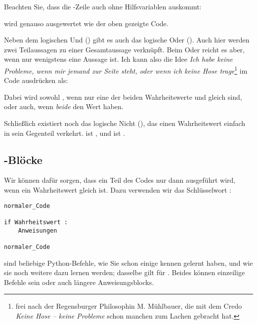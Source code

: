 Beachten Sie, dass die -Zeile auch ohne Hilfsvariablen auskommt:
\begin{center}
\end{center}
wird genauso ausgewertet wie der oben gezeigte Code.

Neben dem logischen Und () gibt es auch das logische Oder (). Auch hier werden zwei Teilaussagen zu einer Gesamtaussage verknüpft. Beim Oder reicht es aber, wenn nur wenigstens eine Aussage  ist. Ich kann also die Idee \emph{Ich habe keine Probleme, wenn mir jemand zur Seite steht, oder wenn ich keine Hose trage}\footnote{frei nach der Regensburger Philosophin M. Mühlbauer, die mit dem Credo \emph{Keine Hose -- keine Probleme} schon manchen zum Lachen gebracht hat.} im Code ausdrücken als:
\begin{center}
\end{center}
Dabei wird  sowohl , wenn nur eine der beiden Wahrheitswerte  und  gleich  sind, oder auch, wenn \emph{beide} den Wert  haben.

Schließlich existiert noch das logische Nicht (), das einen Wahrheitswert einfach in sein Gegenteil verkehrt.  ist , und  ist .

\subsection{-Blöcke}
Wir können dafür sorgen, dass ein Teil des Codes nur dann ausgeführt wird, wenn ein Wahrheitswert gleich  ist. Dazu verwenden wir das Schlüsselwort :
\begin{codebox}
\begin{verbatim}
normaler_Code

if Wahrheitswert :
    Anweisungen

normaler_Code
\end{verbatim}
\end{codebox}

 sind beliebige Python-Befehle, wie Sie schon einige kennen gelernt haben, und wie sie noch weitere dazu lernen werden; dasselbe gilt für . Beides können einzeilige Befehle sein oder auch längere Anweisungsblocks.

